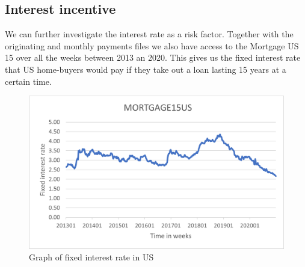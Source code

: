     
    

\subsection{Interest incentive}
We can further investigate the interest rate as a risk factor. Together with the originating and monthly payments files we also have access to the Mortgage US 15 over all the weeks between 2013 an 2020. This gives us the fixed interest rate that US home-buyers would pay if they take out a loan lasting 15 years at a certain time.

    \begin{figure}[H]
        \centering
        \includegraphics[scale=0.7]{Latex/Report/Figures/mortgage15US.png}
        \caption{Graph of fixed interest rate in US}
        \label{mortgage15us}
    \end{figure}

